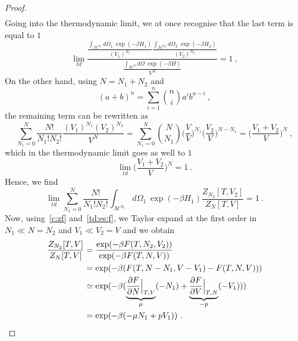\begin{proof}
\begin{equation*}
\begin{aligned}
        \end{aligned}
        \end{equation*}
        Going into the thermodynamic limit, we at once recognise that the last term is equal to $1$ 
        \begin{equation*}
            \lim_{td} \frac{\frac{\int_{\mathcal M^{N_1}} d\Omega_1 ~ \exp(-\beta H_1)}{(V_1)^{N_1}} \frac{\int_{\mathcal M^{N_2}} d\Omega_2 ~ \exp(-\beta H_2)}{(V_2)^{N_2}}}{\frac{\int_{\mathcal M^N} d\Omega ~ \exp(-\beta H)}{V^N}} = 1 ~,
        \end{equation*}
        On the other hand, using $N = N_1 + N_2$ and 
        \begin{equation*}
            (a + b)^n = \sum_{i=1}^{n} \binom{n}{i} a^i b^{n-i}  ~,
        \end{equation*}
        the remaining term can be rewritten as 
        \begin{equation*}
            \sum_{N_1 = 0}^{N} \frac{N!}{N_1! N_2!} \frac{(V_1)^{N_1} (V_2)^{N_2}}{V^N} = \sum_{N_1 = 0}^{N} \binom{N}{N_1} \Big ( \frac{V}{V} \Big)^{N_1}  \Big ( \frac{V_2}{V} \Big)^{N - N_1} = \Big ( \frac{V_1 + V_2}{V} \Big)^N  ~,
        \end{equation*}
        which in the thermodynamic limit goes as well to $1$ 
        \begin{equation*}
            \lim_{td} \Big ( \frac{V_1 + V_2}{V} \Big)^N  = 1 ~.
        \end{equation*} 
        Hence, we find
        \begin{equation*}
            \lim_{td} \sum_{N_1 = 0}^{N} \frac{N!}{N_1! N_2!} \int_{\mathcal M^{N_1}} d\Omega_1 ~\exp(-\beta H_1) \frac{Z_{N_2} [T, V_2]}{Z_N [T, V]} = 1 ~.
        \end{equation*}
        Now, using~\eqref{c:zf} and~\eqref{td:es:f}, we Taylor expand at the first order in $N_1 \ll N = N_2$ and $V_1 \ll V_2 = V$ and we obtain 
        \begin{equation*}
        \begin{aligned}
            \frac{Z_{N_2}[T, V]}{Z_N[T, V]} & = \frac{\exp(-\beta F(T, N_2, V_2))}{\exp(-\beta F(T, N, V))} \\ & = \exp(-\beta (F(T, N-N_1, V-V_1) - F(T, N, V))) \\ & \simeq \exp(-\beta(\underbrace{\pdv{F}{N} \Big \vert_{T, V}}_{\mu} (-N_1) + \underbrace{\pdv{F}{V} \Big \vert_{T, N}}_{-p} (-V_1))) \\ & = \exp(-\beta(-\mu N_1 + p V_1)) ~.
        \end{aligned}

\end{equation*}
\end{proof}
